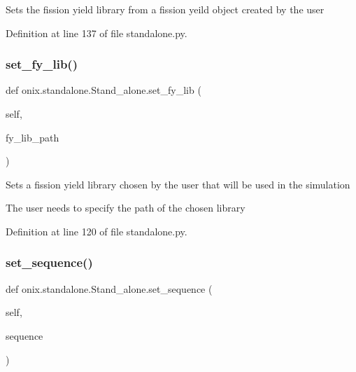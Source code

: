 \begin{DoxyVerb}Sets the fission yield library from a fission yeild object created by the user\end{DoxyVerb}
 

Definition at line 137 of file standalone.\+py.

\mbox{\label{classonix_1_1standalone_1_1Stand__alone_a94316bbe41b98a2fe92fe9e557b558c6}} 
\subsubsection{\texorpdfstring{set\+\_\+fy\+\_\+lib()}{set\_fy\_lib()}}
{\footnotesize\ttfamily def onix.\+standalone.\+Stand\+\_\+alone.\+set\+\_\+fy\+\_\+lib (\begin{DoxyParamCaption}\item[{}]{self,  }\item[{}]{fy\+\_\+lib\+\_\+path }\end{DoxyParamCaption})}

\begin{DoxyVerb}Sets a fission yield library chosen by the user that will be used in the simulation

The user needs to specify the path of the chosen library\end{DoxyVerb}
 

Definition at line 120 of file standalone.\+py.

\mbox{\label{classonix_1_1standalone_1_1Stand__alone_a399c649f8541b73b1259865d04ed188f}} 
\subsubsection{\texorpdfstring{set\+\_\+sequence()}{set\_sequence()}}
{\footnotesize\ttfamily def onix.\+standalone.\+Stand\+\_\+alone.\+set\+\_\+sequence (\begin{DoxyParamCaption}\item[{}]{self,  }\item[{}]{sequence }\end{DoxyParamCaption})}

